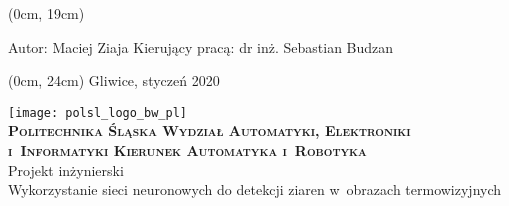 \newpage
\thispagestyle{empty}
\textblockorigin{3cm}{2.5cm}

\begin{onehalfspacing}
\begin{center}
    \begin{textblock*}{\textwidth}(0cm, 19cm)
	\begin{flushleft}
	Autor: Maciej Ziaja \linebreak
	Kierujący pracą: dr inż. Sebastian Budzan \linebreak
	\end{flushleft}
	\end{textblock*}
	\begin{textblock*}{\textwidth}(0cm, 24cm)
	\fontsize{12}{12} \selectfont
	Gliwice, styczeń 2020
	\end{textblock*}
    \vspace{2\baselineskip}
	\texttt{[image: polsl\_logo\_bw\_pl]}\\
	\vspace{2\baselineskip}
	\fontsize{18}{18} \selectfont
	\textbf{\textsc{Politechnika Śląska \linebreak
	Wydział Automatyki, Elektroniki i~Informatyki \linebreak
	Kierunek Automatyka i~Robotyka}} \\
	\vspace{3\baselineskip}
	Projekt inżynierski \\
	\vspace{3\baselineskip}
	\fontsize{14}{14} \selectfont
	Wykorzystanie sieci neuronowych do detekcji ziaren
	w~obrazach termowizyjnych
\end{center}
\end{onehalfspacing}
\restoregeometry
